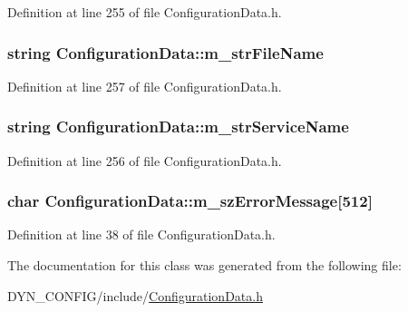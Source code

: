 Definition at line 255 of file Configuration\+Data.\+h.

\subsubsection[{\texorpdfstring{m\+\_\+str\+File\+Name}{m_strFileName}}]{\setlength{\rightskip}{0pt plus 5cm}string Configuration\+Data\+::m\+\_\+str\+File\+Name\hspace{0.3cm}{\ttfamily [protected]}}\hypertarget{classConfigurationData_a3c2246db7a0a2cfa91081e91a98625df}{}\label{classConfigurationData_a3c2246db7a0a2cfa91081e91a98625df}


Definition at line 257 of file Configuration\+Data.\+h.

\subsubsection[{\texorpdfstring{m\+\_\+str\+Service\+Name}{m_strServiceName}}]{\setlength{\rightskip}{0pt plus 5cm}string Configuration\+Data\+::m\+\_\+str\+Service\+Name\hspace{0.3cm}{\ttfamily [protected]}}\hypertarget{classConfigurationData_aae2da98258156ab8a7b4884694d5cea7}{}\label{classConfigurationData_aae2da98258156ab8a7b4884694d5cea7}


Definition at line 256 of file Configuration\+Data.\+h.

\subsubsection[{\texorpdfstring{m\+\_\+sz\+Error\+Message}{m_szErrorMessage}}]{\setlength{\rightskip}{0pt plus 5cm}char Configuration\+Data\+::m\+\_\+sz\+Error\+Message\mbox{[}512\mbox{]}}\hypertarget{classConfigurationData_aefb528ceef393a3d4a016ab52fca5c0b}{}\label{classConfigurationData_aefb528ceef393a3d4a016ab52fca5c0b}


Definition at line 38 of file Configuration\+Data.\+h.



The documentation for this class was generated from the following file\+:\begin{DoxyCompactItemize}
\item 
D\+Y\+N\+\_\+\+C\+O\+N\+F\+I\+G/include/\hyperlink{ConfigurationData_8h}{Configuration\+Data.\+h}\end{DoxyCompactItemize}
